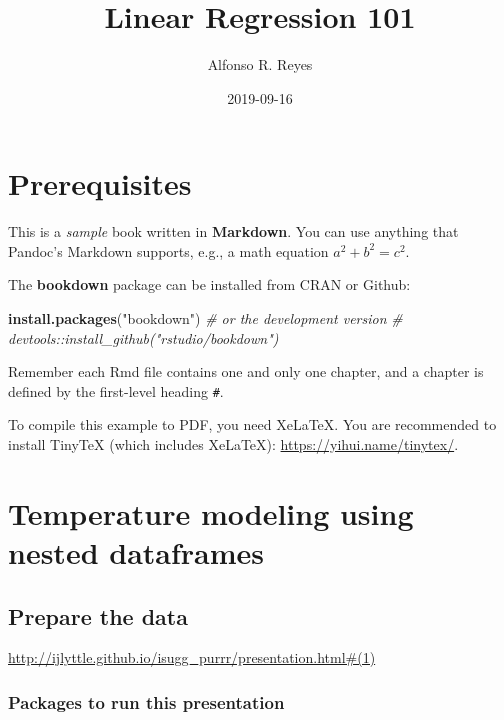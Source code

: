 \documentclass[]{book}
\title{Linear Regression 101}
\author{Alfonso R. Reyes}
\date{2019-09-16}
\newenvironment{Shaded}{\begin{snugshade}}{\end{snugshade}}
\newcommand{\CommentTok}[1]{\textcolor[rgb]{0.56,0.35,0.01}{\textit{#1}}}
\newcommand{\KeywordTok}[1]{\textcolor[rgb]{0.13,0.29,0.53}{\textbf{#1}}}
\newcommand{\NormalTok}[1]{#1}
\newcommand{\StringTok}[1]{\textcolor[rgb]{0.31,0.60,0.02}{#1}}
\begin{document}
\maketitle

{
\setcounter{tocdepth}{1}
\tableofcontents
}
\hypertarget{prerequisites}{%
\chapter*{Prerequisites}\label{prerequisites}}

This is a \emph{sample} book written in \textbf{Markdown}. You can use anything that Pandoc's Markdown supports, e.g., a math equation \(a^2 + b^2 = c^2\).

The \textbf{bookdown} package can be installed from CRAN or Github:

\begin{Shaded}
\begin{Highlighting}[]
\KeywordTok{install.packages}\NormalTok{(}\StringTok{"bookdown"}\NormalTok{)}
\CommentTok{# or the development version}
\CommentTok{# devtools::install_github("rstudio/bookdown")}
\end{Highlighting}
\end{Shaded}

Remember each Rmd file contains one and only one chapter, and a chapter is defined by the first-level heading \texttt{\#}.

To compile this example to PDF, you need XeLaTeX. You are recommended to install TinyTeX (which includes XeLaTeX): \url{https://yihui.name/tinytex/}.

\hypertarget{temperature-modeling-using-nested-dataframes}{%
\chapter{Temperature modeling using nested dataframes}\label{temperature-modeling-using-nested-dataframes}}

\hypertarget{prepare-the-data}{%
\section{Prepare the data}\label{prepare-the-data}}

\url{http://ijlyttle.github.io/isugg_purrr/presentation.html\#(1)}

\hypertarget{packages-to-run-this-presentation}{%
\subsection{Packages to run this presentation}\label{packages-to-run-this-presentation}}
\end{document}
